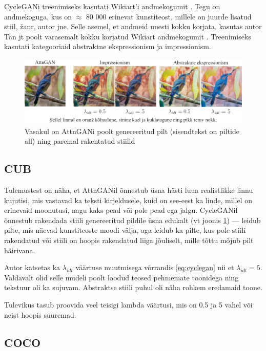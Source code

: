 \documentclass{vilgym}
\begin{document}
	CycleGANi treenimiseks kasutati Wikiart'i andmekogumit \parencite{wikiart}. Tegu on andmekoguga, kus on $\approx$ 80 000 erinevat kunstiteost, millele on juurde lisatud stiil, žanr, autor jne. Selle asemel, et andmeid uuesti kokku korjata, kasutas autor Tan jt poolt varasemalt kokku korjatud Wikiart andmekogumit \parencite{artgan}. Treenimiseks kasutati kategooriaid abstraktne ekspressionism ja impressionism.

	\begin{figure}
		\includegraphics[width=\linewidth]{images/linnud.jpg}
		\caption{Vasakul on AttnGANi poolt genereeritud pilt (sisendtekst on piltide all) ning paremal rakentatud stiilid}
		\label{fig:cub}
	\end{figure}

	\subsection{CUB}
	Tulemustest on näha, et AttnGANil õnnestub üsna hästi luua realistlikke linnu kujutisi, mis vastavad ka teksti kirjeldusele, kuid on see-eest ka linde, millel on erinevaid moonutusi, nagu kaks pead või pole pead ega jalgu. CycleGANil õnnestub rakendada stiili genereeritud pildile üsna edukalt (vt joonis \ref{fig:cub}) --- leidub pilte, mis näevad kunstiteoste moodi välja, aga leidub ka pilte, kus pole stiili rakendatud või stiili on hoopis rakendatud liiga jõuliselt, mille tõttu mõjub pilt häirivana.

	Autor katsetas ka $ \lambda_{idt} $ väärtuse muutmisega võrrandis \ref{eq:cyclegan} nii et $ \lambda_{idt} = 5 $. Valdavalt olid selle mudeli poolt loodud teosed pehmemate toonidega ning tekstuur oli ka sujuvam. Abstraktse stiili puhul oli näha rohkem eredamaid toone.

	Tulevikus tasub proovida veel teisigi lambda väärtusi, mis on 0.5 ja 5 vahel või neist hoopis suuremad.

	\subsection{COCO}
\end{document}

